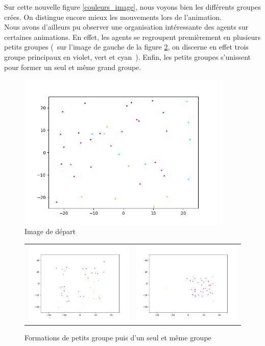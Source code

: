 \documentclass[french, a4paper, 12pt, openany]{report}
\begin{document}
   Sur cette nouvelle figure \ref{couleurs_image}, nous voyons bien les différents groupes crées. On distingue encore mieux les mouvements lors de l'animation.\\
   
   Nous avons d'ailleurs pu observer une organisation intéressante des agents sur certaines animations. En effet, les agents se regroupent premièrement en plusieurs petits groupes (~sur l'image de gauche de la figure \ref{mouvement_grp2}, on discerne en effet trois groupe principaux en violet, vert et cyan~). Enfin, les petits groupes s'unissent pour former un seul et même grand groupe.
   
    \begin{figure}[!h]
		\centering
		\includegraphics[width=10cm]{images/image_8.png}
		\caption{Image de départ }
		\label{mouvement_grp}
	\end{figure} 
	
   \begin{figure}[!h]
		\centering
		\begin{tabular}{cc}
			\includegraphics[width=8cm]{images/image_7.png} & \includegraphics[width=8cm]{images/image_9.png} \\
		\end{tabular}
		\caption{Formations de petits groupe puis d'un seul et même groupe}
		\label{mouvement_grp2}
	\end{figure} 
	
\end{document}
